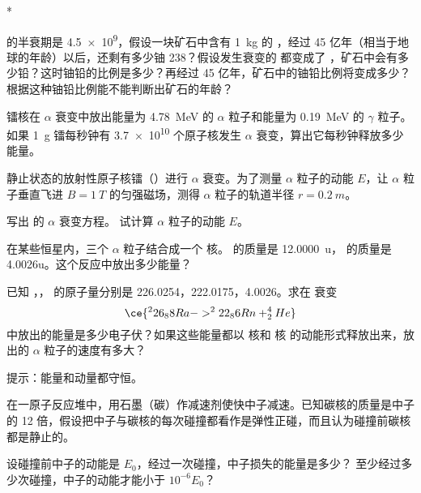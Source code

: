 \begin{Exercise}*
\begin{question}
  \item {} 的半衰期是 \qty{4.5e9}{}，假设一块矿石中含有 \qty{1}{kg} 的  ，经过 45 亿年（相当于地球的年龄）以后，还剩有多少铀 238？假设发生衰变的   都变成了  ，矿石中会有多少铅？这时铀铅的比例是多少？再经过 45 亿年，矿石中的铀铅比例将变成多少？ 根据这种铀铅比例能不能判断出矿石的年龄？
  \item 镭核在 $\alpha$ 衰变中放出能量为 \qty{4.78}{MeV} 的 $\alpha$ 粒子和能量为 \qty{0.19}{MeV} 的 $\gamma$ 粒子。如果 \qty{1}{g} 镭每秒钟有 \num{3.7e10} 个原子核发生 $\alpha$ 衰变，算出它每秒钟释放多少能量。
  \item 静止状态的放射性原子核镭（）进行 $\alpha$ 衰变。为了测量 $\alpha$ 粒子的动能 $E$，让 $\alpha$ 粒子垂直飞进 $B=\qty{1}{T} $ 的匀强磁场，测得 $\alpha$ 粒子的轨道半径 $r=\qty{0.2}{m}$。
  \begin{tasks}
    \task 写出 的 $\alpha$ 衰变方程。
    \task 试计算 $\alpha$ 粒子的动能 $E$。
  \end{tasks}
  \item 在某些恒星内，三个 $\alpha$ 粒子结合成一个  核。 的质量是 \qty{12.0000}{u}， 的质量是 4.0026u。这个反应中放出多少能量？
  \item 已知 ，， 的原子量分别是 226.0254，222.0175，4.0026。求在  衰变
  \[ \ce{ ^226_88Ra -> ^222_86Rn + ^4_2He}\]
  中放出的能量是多少电子伏？如果这些能量都以  核和 核 的动能形式释放出来，放出的 $\alpha$ 粒子的速度有多大？

  提示：能量和动量都守恒。
  \item 在一原子反应堆中，用石墨（碳）作减速剂使快中子减速。已知碳核的质量是中子的 12 倍，假设把中子与碳核的每次碰撞都看作是弹性正碰，而且认为碰撞前碳核都是静止的。
  \begin{tasks}
    \task 设碰撞前中子的动能是 $E_0$，经过一次碰撞，中子损失的能量是多少？
    \task 至少经过多少次碰撞，中子的动能才能小于 $10^{-6}E_0$？
  \end{tasks}
\end{question}
\end{Exercise}
